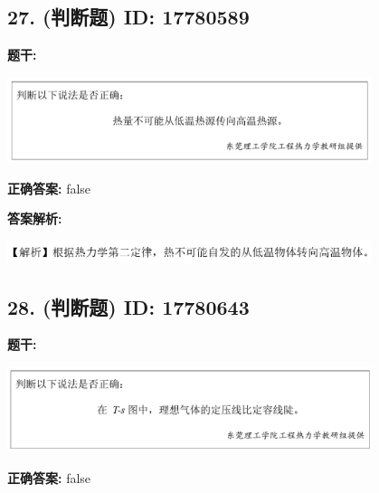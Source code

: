 \documentclass[12pt]{article}
\begin{document}
\vspace{0.5em}\hrulefill\vspace{1em}

\subsection*{27. (判断题) \small ID: 17780589}

\textbf{题干:}


\begin{center}\includegraphics[width=0.8\textwidth, height=0.25\textheight, keepaspectratio]{question_27_17780589/title_img_1.png}\end{center}

\textbf{正确答案:}
false

\textbf{答案解析:}


\begin{center}\includegraphics[width=0.8\textwidth, height=0.25\textheight, keepaspectratio]{question_27_17780589/correct_replay_img_1.png}\end{center}

\vspace{0.5em}\hrulefill\vspace{1em}

\subsection*{28. (判断题) \small ID: 17780643}

\textbf{题干:}


\begin{center}\includegraphics[width=0.8\textwidth, height=0.25\textheight, keepaspectratio]{question_28_17780643/title_img_1.png}\end{center}

\textbf{正确答案:}
false
\end{document}

